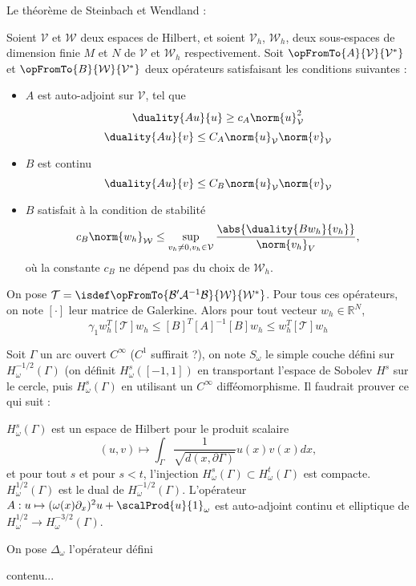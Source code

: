 \documentclass[]{article}
\begin{document}
	Le théorème de Steinbach et Wendland :
	\begin{The}
		Soient $\mathcal{V}$ et $\mathcal{W}$ deux espaces de Hilbert, et soient $\mathcal{V}_h$, $\mathcal{W}_h$, deux sous-espaces de dimension finie $M$ et $N$ de $\mathcal{V}$ et $\mathcal{W}_h$ respectivement. Soit $\opFromTo{A}{\mathcal{V}}{\mathcal{V^*}}$ et $\opFromTo{B}{\mathcal{W}}{\mathcal{V^*}}$ deux opérateurs satisfaisant les conditions suivantes :
		\begin{itemize}
			\item $A$ est auto-adjoint sur $\mathcal{V}$, tel que 
			\[\duality{Au}{u} \geq c_A\norm{u}_\mathcal{V}^2\]
			\[\duality{Au}{v} \leq C_A \norm{u}_{\mathcal{V}}\norm{v}_{\mathcal{V}}\]
			\item $B$ est continu
			\[\duality{Au}{v} \leq C_B \norm{u}_{\mathcal{V}} \norm{v}_{\mathcal{V}}\]
			\item $B$ satisfait à la condition de stabilité 
			\[c_B\norm{w_h}_{\mathcal{W}} \leq \sup_{v_h \neq 0, v_h \in \mathcal{V}} \dfrac{\abs{\duality{B w_h}{v_h}}}{\norm{v_h}_{V}},\]
			où la constante $c_B$ ne dépend pas du choix de $\mathcal{W}_h$. 
		\end{itemize}
		On pose $\mathcal{T} =\isdef  \opFromTo{\mathcal{B}'\mathcal{A}^{-1}\mathcal{B}}{\mathcal{W}}{\mathcal{W}^*} $. Pour tous ces opérateurs, on note $[\cdot]$ leur matrice de Galerkine. Alors pour tout vecteur $w_h \in \mathbb{R}^N$, 
		\[\gamma_1  w_h^T \left[\mathcal{T} \right]w_h \leq [B]^T[A]^{-1}[B] w_h \leq w_h^T \left[ \mathcal{T}\right] w_h \]
		
	\end{The}
	Soit $\Gamma$ un arc ouvert $C^{\infty}$ ($C^1$ suffirait ?), on note $S_\omega$ le simple couche défini sur $H_\omega^{-1/2}(\Gamma)$ (on définit $H_\omega^{s}([-1,1])$ en transportant l'espace de Sobolev $H^s$ sur le cercle, puis $H_\omega^{s}(\Gamma)$ en utilisant un $C^{\infty}$ difféomorphisme. Il faudrait prouver ce qui suit :
	\begin{Conj}
		$H_{\omega}^s(\Gamma)$ est un espace de Hilbert pour le produit scalaire
		\[(u,v) \mapsto \int_{\Gamma} \frac{1}{\sqrt{d(x,\partial \Gamma)}}u(x)v(x)dx,\]
		et pour tout $s$ et pour $s < t$, l'injection $H^s_{\omega}(\Gamma) \subset H^{t}_{\omega}(\Gamma)$ est compacte. 
		$H^{1/2}_{\omega}(\Gamma)$ est le dual de $H^{-1/2}_\omega(\Gamma)$.
		L'opérateur $A : u \mapsto (\omega(x)\partial_x)^2 u + \scalProd{u}{1}_\omega$ est auto-adjoint continu et elliptique de $H_{\omega}^{1/2} \longrightarrow H_{\omega}^{-3/2}(\Gamma)$. 
	\end{Conj}
	On pose $\Delta_\omega$ l'opérateur défini 
	\begin{The}
		contenu...
	\end{The}
\end{document}
